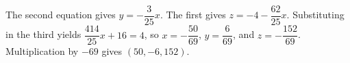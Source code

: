 The second equation gives $y=-\dfrac{3}{25}x$. The first gives $z=-4-\dfrac{62}{25}x$. Substituting in the third yields $\dfrac{414}{25}x+16=4$, so $x=-\dfrac{50}{69}$, $y=\dfrac{6}{69}$, and $z=-\dfrac{152}{69}$. Multiplication by $-69$ gives $\boxed{(50,-6,152)}$.
